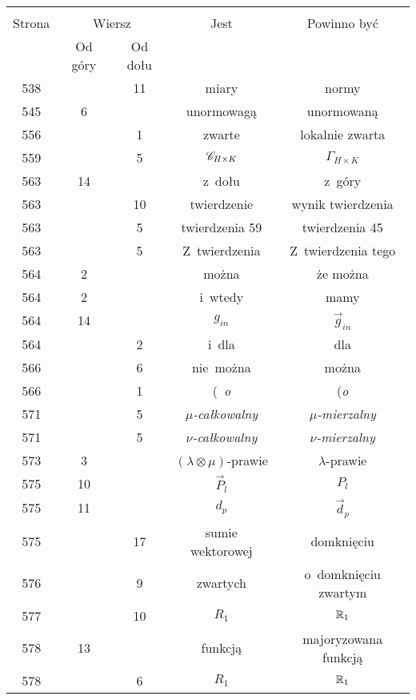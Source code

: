 \documentclass[a4paper,11pt]{article}
\begin{document}
\begin{center}

  \begin{tabular}{|c|c|c|c|c|}
    \hline
    & \multicolumn{2}{c|}{} & & \\
    Strona & \multicolumn{2}{c|}{Wiersz} & Jest
                              & Powinno być \\ \cline{2-3}
    & Od góry & Od dołu & & \\
    \hline
    538 & & 11 & miary & normy \\
    545 &  6 & & unormowagą & unormowaną \\
    556 & &  1 & zwarte & lokalnie zwarta \\
    559 & &  5 & $\mathcal{C}_{ H \times K }$ & $\Gamma_{ H \times K }$ \\
    563 & 14 & & z~dołu & z~góry \\
    563 & & 10 & twierdzenie & wynik twierdzenia \\
    563 & &  5 & twierdzenia 59 & twierdzenia 45 \\
    563 & &  5 & Z~twierdzenia & Z~twierdzenia tego \\
    564 &  2 & & można & że można \\
    564 &  2 & & i~wtedy & mamy \\
    564 & 14 & & $g_{ i n }$ & $\vec{ g }_{ i n }$ \\
    564 & &  2 & i~dla & dla \\
    566 & &  6 & nie~można & można \\
    566 & &  1 & (~\textit{o} & (\textit{o} \\
    571 & &  5 & \textit{$\mu$-całkowalny}
           & \textit{$\mu$-mierzalny} \\
    571 & &  5 & \textit{$\nu$-całkowalny}
           & \textit{$\nu$-mierzalny} \\
    573 &  3 & & $( \lambda \otimes \mu )$-prawie & $\lambda$-prawie \\
    575 & 10 & & $\vec{ P }_{ l }$ & $P_{ l }$ \\
    575 & 11 & & $d_{ p }$ & $\vec{ d }_{ p }$ \\
    575 & & 17 & sumie wektorowej & domknięciu \\
    576 & &  9 & zwartych & o~domknięciu zwartym \\
    577 & & 10 & $R_{ 1 }$ & $\mathbb{R}_{ 1 }$ \\
    578 & 13 & & funkcją & majoryzowana funkcją \\
    578 & &  6 & $R_{ 1 }$ & $\mathbb{R}_{ 1 }$ \\

\end{tabular}
\end{center}
\end{document}
